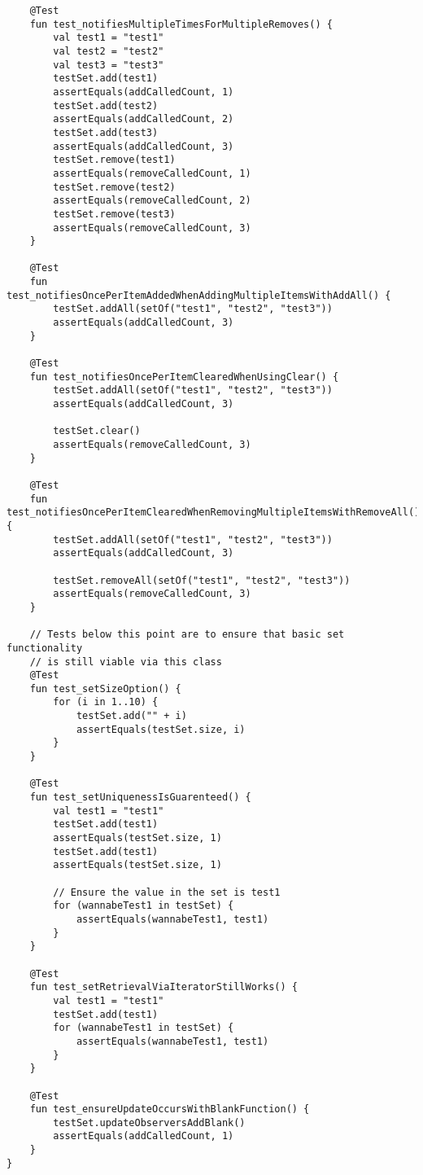 \begin{verbatim}
    @Test
    fun test_notifiesMultipleTimesForMultipleRemoves() {
        val test1 = "test1"
        val test2 = "test2"
        val test3 = "test3"
        testSet.add(test1)
        assertEquals(addCalledCount, 1)
        testSet.add(test2)
        assertEquals(addCalledCount, 2)
        testSet.add(test3)
        assertEquals(addCalledCount, 3)
        testSet.remove(test1)
        assertEquals(removeCalledCount, 1)
        testSet.remove(test2)
        assertEquals(removeCalledCount, 2)
        testSet.remove(test3)
        assertEquals(removeCalledCount, 3)
    }

    @Test
    fun test_notifiesOncePerItemAddedWhenAddingMultipleItemsWithAddAll() {
        testSet.addAll(setOf("test1", "test2", "test3"))
        assertEquals(addCalledCount, 3)
    }

    @Test
    fun test_notifiesOncePerItemClearedWhenUsingClear() {
        testSet.addAll(setOf("test1", "test2", "test3"))
        assertEquals(addCalledCount, 3)

        testSet.clear()
        assertEquals(removeCalledCount, 3)
    }

    @Test
    fun test_notifiesOncePerItemClearedWhenRemovingMultipleItemsWithRemoveAll() {
        testSet.addAll(setOf("test1", "test2", "test3"))
        assertEquals(addCalledCount, 3)

        testSet.removeAll(setOf("test1", "test2", "test3"))
        assertEquals(removeCalledCount, 3)
    }

    // Tests below this point are to ensure that basic set functionality
    // is still viable via this class
    @Test
    fun test_setSizeOption() {
        for (i in 1..10) {
            testSet.add("" + i)
            assertEquals(testSet.size, i)
        }
    }

    @Test
    fun test_setUniquenessIsGuarenteed() {
        val test1 = "test1"
        testSet.add(test1)
        assertEquals(testSet.size, 1)
        testSet.add(test1)
        assertEquals(testSet.size, 1)

        // Ensure the value in the set is test1
        for (wannabeTest1 in testSet) {
            assertEquals(wannabeTest1, test1)
        }
    }

    @Test
    fun test_setRetrievalViaIteratorStillWorks() {
        val test1 = "test1"
        testSet.add(test1)
        for (wannabeTest1 in testSet) {
            assertEquals(wannabeTest1, test1)
        }
    }

    @Test
    fun test_ensureUpdateOccursWithBlankFunction() {
        testSet.updateObserversAddBlank()
        assertEquals(addCalledCount, 1)
    }
}
\end{verbatim}

